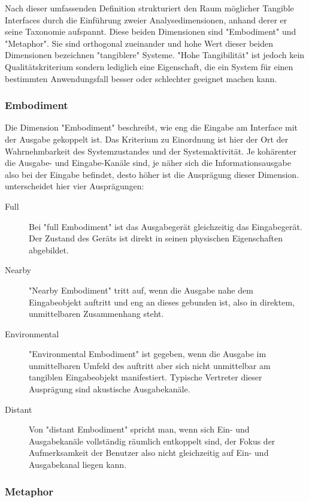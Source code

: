 Nach dieser umfassenden Definition strukturiert \citeauthor{Fishkin04} den Raum möglicher Tangible Interfaces durch die Einführung zweier Analysedimensionen, anhand derer er seine  Taxonomie aufspannt. Diese beiden Dimensionen sind "Embodiment" und "Metaphor". Sie sind orthogonal zueinander und hohe Wert dieser beiden Dimensionen bezeichnen "tangiblere" Systeme. "Hohe Tangibilität" ist jedoch kein Qualitätskriterium sondern lediglich eine Eigenschaft, die ein System für einen bestimmten Anwendungsfall besser oder schlechter geeignet machen kann.

\subsubsection{Embodiment}
Die Dimension "Embodiment" beschreibt, wie eng die Eingabe am Interface mit der Ausgabe gekoppelt ist. Das Kriterium zu Einordnung ist hier der Ort der Wahrnehmbarkeit des Systemzustandes und der Systemaktivität. Je kohärenter die Ausgabe- und Eingabe-Kanäle sind, je näher sich die Informationsausgabe also bei der Eingabe befindet, desto höher ist die Ausprägung dieser Dimension. \citeauthor{Fishkin04} unterscheidet hier vier Ausprägungen:
\begin{description}
 \item[Full] Bei "full Embodiment" ist das Ausgabegerät gleichzeitig das Eingabegerät. Der Zustand des Geräts ist direkt in seinen physischen Eigenschaften abgebildet.
 \item[Nearby] "Nearby Embodiment" tritt auf, wenn die Ausgabe nahe dem Eingabeobjekt auftritt und eng an dieses gebunden ist, also in direktem, unmittelbaren Zusammenhang steht. 
 \item[Environmental] "Environmental Embodiment" ist gegeben, wenn die Ausgabe im unmittelbaren Umfeld des auftritt aber sich nicht unmittelbar am tangiblen Eingabeobjekt manifestiert. Typische Vertreter dieser Ausprägung sind akustische Ausgabekanäle.
 \item[Distant] Von "distant Embodiment" spricht man, wenn sich Ein- und Ausgabekanäle vollständig räumlich entkoppelt sind, der Fokus der Aufmerksamkeit der Benutzer also nicht gleichzeitig auf Ein- und Ausgabekanal liegen kann. 
 \end{description}

\subsubsection{Metaphor}

